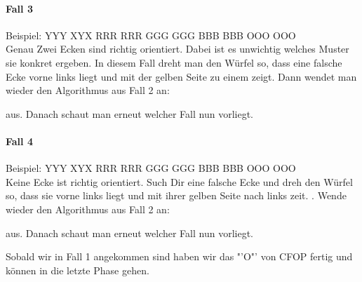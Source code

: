 \paragraph{Fall 3}
Beispiel:
\RubikCubeGreyAll%
            {Y}{Y}{Y}
            {X}{Y}{X}%
               {R}{R}{R}
	       {R}{R}{R}%
	       {G}{G}{G}
	       {G}{G}{G}%
	      {B}{B}{B}
	      {B}{B}{B}%
	      {O}{O}{O}
	      {O}{O}{O}%
\\[1em]
Genau Zwei Ecken sind richtig orientiert. Dabei ist es unwichtig welches Muster sie konkret ergeben.
In diesem Fall dreht man den Würfel so, dass eine falsche Ecke vorne links liegt und mit
der gelben Seite zu einem zeigt. Dann wendet man wieder den Algorithmus aus Fall 2 an:
\begin{center}
\end{center}
aus. Danach schaut man erneut welcher Fall nun vorliegt.

\paragraph{Fall 4}
Beispiel:
\RubikCubeGreyAll%
            {Y}{Y}{Y}
            {X}{Y}{X}%
               {R}{R}{R}
	       {R}{R}{R}%
	       {G}{G}{G}
	       {G}{G}{G}%
	      {B}{B}{B}
	      {B}{B}{B}%
	      {O}{O}{O}
	      {O}{O}{O}%
\\[1em]
Keine Ecke ist richtig orientiert. Such Dir eine falsche Ecke und dreh den Würfel so,
dass sie vorne links liegt und mit ihrer gelben Seite nach links zeit. .
Wende wieder den Algorithmus aus Fall 2 an:
\begin{center}
\end{center}
aus. Danach schaut man erneut welcher Fall nun vorliegt.

Sobald wir in Fall 1 angekommen sind haben wir das "'O"' von CFOP fertig und
können in die letzte Phase gehen.
